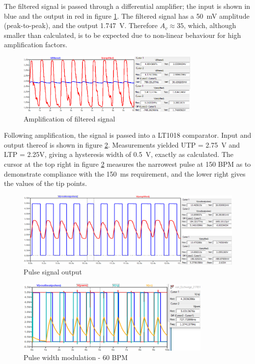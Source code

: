 The filtered signal is passed through a differential amplifier; the input is shown in blue and the output in red in figure \ref{fig:amplified}. The filtered signal has a \SI{50}{mV} amplitude (peak-to-peak), and the output \SI{1.747}{V}. Therefore $A_v \approx 35$, which, although smaller than calculated, is to be expected due to non-linear behaviour for high amplification factors. 
\begin{figure}
\centering
\vspace{0.44cm}
\includegraphics[width=0.8\textwidth]{./Figures/amplified}
\caption{Amplification of filtered signal}
\label{fig:amplified}
\end{figure}

Following amplification, the signal is passed into a LT1018 comparator. Input and output thereof is shown in figure \ref{fig:pulses}. Measurements yielded UTP = \SI{2.75}{V} and LTP = {2.25}{V}, giving a hysteresis width of \SI{0.5}{V}, exactly as calculated. The cursor at the top right in figure \ref{fig:pulses} measures the narrowest pulse at 150 BPM as to demonstrate compliance with the \SI{150}{ms} requirement, and the lower right gives the values of the tip points.

\begin{figure}[h]
\centering
\includegraphics[width=\textwidth]{./Figures/pulses}
\caption{Pulse signal output}
\label{fig:pulses}
\end{figure}


\begin{figure}
\centering
\includegraphics[width=0.85\textwidth]{./Figures/pwm}
\caption{Pulse width modulation - 60 BPM}
\label{fig:pwm}
\end{figure}


